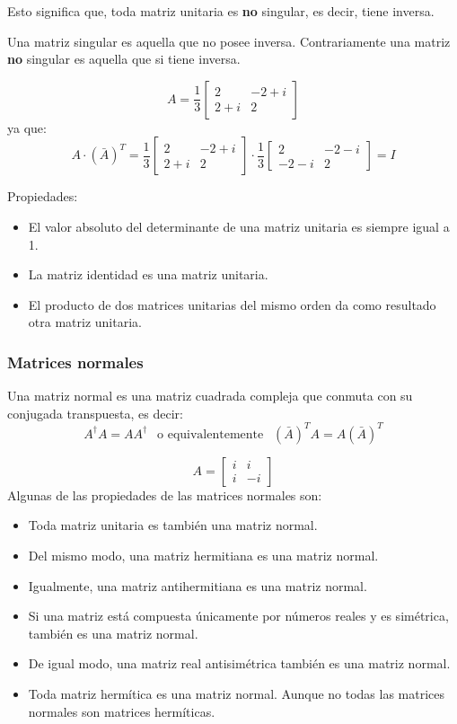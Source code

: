 Esto significa que, toda matriz unitaria es \textbf{no} singular, es decir, tiene inversa.

\begin{tcolorbox}[remember, title=Recordatorio]
  Una matriz singular es aquella que no posee inversa. Contrariamente una matriz \textbf{no} singular es aquella que si tiene inversa.
\end{tcolorbox}
\[
  A = \frac{1}{3} \begin{bmatrix}
    2 & -2+i \\
    2+i & 2
  \end{bmatrix}
\]
ya que:
\[
A \cdot (\bar{A})^T = \frac{1}{3} \begin{bmatrix}
    2 & -2+i \\
    2+i & 2
  \end{bmatrix} \cdot \frac{1}{3} \begin{bmatrix}
    2 & -2-i \\
    -2-i & 2
  \end{bmatrix} = I
\]

Propiedades:
\begin{itemize}
  \item El valor absoluto del determinante de una matriz unitaria es siempre igual a 1.
  \item La matriz identidad es una matriz unitaria.
  \item El producto de dos matrices unitarias del mismo orden da como resultado otra matriz unitaria.
\end{itemize}

\subsubsection{Matrices normales}

Una matriz normal es una matriz cuadrada compleja que conmuta con su conjugada transpuesta, es decir:
\[
  A^\dagger A = A A^\dagger ~~ \text{ o equivalentemente } ~~ (\bar{A})^T A = A (\bar{A})^T
\]

\[
  A = \begin{bmatrix}
    i & i \\ i & -i
  \end{bmatrix}
\]
Algunas de las propiedades de las matrices normales son:
\begin{itemize}
  \item Toda matriz unitaria es también una matriz normal.
  \item Del mismo modo, una matriz hermitiana es una matriz normal.
  \item Igualmente, una matriz antihermitiana es una matriz normal.
  \item Si una matriz está compuesta únicamente por números reales y es simétrica, también es una matriz normal.
  \item De igual modo, una matriz real antisimétrica también es una matriz normal.
  \item Toda matriz hermítica es una matriz normal. Aunque no todas las matrices normales son matrices hermíticas.
\end{itemize}

